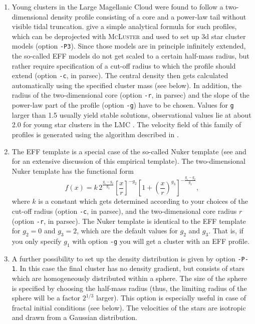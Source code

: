 \documentclass[useAMS,usenatbib]{mn2e}
\begin{document}
\begin{enumerate}
\item Young clusters in the Large Magellanic Cloud were found to follow a two-dimensional density profile consisting of a core and a power-law tail without visible tidal truncation. \citet{Elson87} give a simple analytical formula for such profiles, which can be deprojected with \textsc{McLuster} and used to set up 3d star cluster models (option \texttt{-P3}). Since those models are in principle infinitely extended, the so-called EFF models do not get scaled to a certain half-mass radius, but rather require specification of a cut-off radius to which the profile should extend (option \texttt{-c}, in parsec). The central density then gets calculated automatically using the specified cluster mass (see below). In addition, the radius of the two-dimensional core (option \texttt{-r}, in parsec) and the slope of the power-law part of the profile (option \texttt{-g}) have to be chosen. Values for \texttt{g} larger than 1.5 usually yield stable solutions, observational values lie at about 2.0 for young star clusters in the LMC \citep{Elson87}. The velocity field of this family of profiles is generated using the algorithm described in \citet{Kroupa08}.
\item The EFF template is a special case of the so-called Nuker template (see \citealt{Lauer95} and \citealt{Byun96} for an extensive discussion of this empirical template). The two-dimensional Nuker template has the functional form
\begin{equation}
f(x) = k\,2^{\frac{g_1-g_2}{g_3}}  \left[\frac{x}{r}\right]^{-g_2} \left[1 + \left(\frac{x}{r}\right)^{g_3}\right]^{-\frac{g_1-g_2}{g_3}},
\end{equation}
where $k$ is a constant which gets determined according to your choices of the cut-off radius (option \texttt{-c}, in parsec), and the two-dimensional core radius $r$ (option \texttt{-r}, in parsec). The Nuker template is identical to the EFF template for $g_2 = 0$ and $g_3 = 2$, which are the default values for $g_2$ and $g_3$. That is, if you only specify $g_1$ with option \texttt{-g} you will get a cluster with an EFF profile.
\item A further possibility to set up the density distribution is given by option \texttt{-P-1}. In this case the final cluster has no density gradient, but consists of stars which are homogeneously distributed within a sphere. The size of the sphere is specified by choosing the half-mass radius (thus, the limiting radius of the sphere will be a factor $2^{1/3}$ larger). This option is especially useful in case of fractal initial conditions (see below). The velocities of the stars are isotropic and drawn from a Gaussian distribution. 
\end{enumerate}
\end{document}
